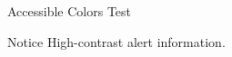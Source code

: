 \documentclass[14pt,t]{beamer}
\begin{document}
\begin{frame}{Accessible Colors Test}
\begin{alertblock}{Notice}
High-contrast alert information.
\end{alertblock}
\end{frame}
\end{document}
